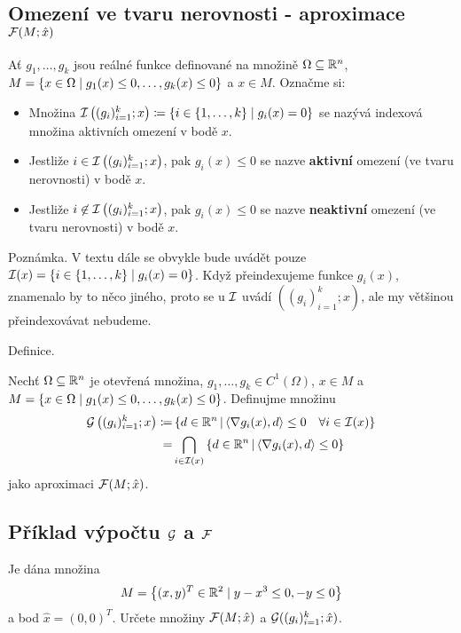 \subsection{Omezení ve tvaru nerovnosti - aproximace \texorpdfstring{$\mathcal{F}(M;\hat x)$}{F(M;x)}}
Ať $g_1, \dots, g_k$ jsou reálné funkce definované na množině $\Omega \subseteq \mathbb{R}^n$,
$M = \left\lbrace x \in \Omega \mid g_1(x) \leq 0, \dots, g_k(x) \leq 0 \right\rbrace$ a $x \in M$.
Označme si:
\begin{itemize}
    \item Množina $\mathcal{I} \left((g_i)_{i=1}^k;x\right)\coloneq \left\lbrace i \in \left\lbrace 1, \dots, k \right\rbrace \mid g_i(x) = 0 \right\rbrace$ se nazývá
    indexová množina aktivních omezení v bodě $x$.
    \item Jestliže $i \in \mathcal{I} \left((g_i)_{i=1}^k;x\right)$, pak $g_i(x) \leq 0$ se nazve \textbf{aktivní} omezení (ve
    tvaru nerovnosti) v bodě $x$.
    \item Jestliže $i \not\in \mathcal{I} \left((g_i)_{i=1}^k;x\right)$, pak $g_i(x) \leq 0$ se nazve \textbf{neaktivní} omezení
    (ve tvaru nerovnosti) v bodě $x$.
\end{itemize}
Poznámka. V textu dále se obvykle bude uvádět pouze $\mathcal{I}(x) = \left\lbrace i \in \left\lbrace 1, \dots, k \right\rbrace \mid g_i(x) = 0 \right\rbrace$. Když
přeindexujeme funkce $g_i(x)$, znamenalo by to něco jiného, proto se u $\mathcal{I}$ uvádí $\left((g_i)_{i=1}^k;x\right)$, ale my
většinou přeindexovávat nebudeme.

Definice.

Nechť $\Omega \subseteq \mathbb{R}^n$ je otevřená množina, $g_1, \dots, g_k \in C^1(\Omega)$, $x \in M$ a $M = \left\lbrace x \in \Omega
\mid g_1(x) \leq 0, \dots, g_k (x) \leq 0 \right\rbrace$. Definujme množinu
\begin{align*}
    \mathcal{G} \left( (g_i)_{i=1}^k; x\right) \coloneq& \left\lbrace d \in \mathbb{R}^n \, \middle| \, \langle \nabla g_i(x), d \rangle \leq 0 \quad \forall i \in \mathcal{I} (x) \right\rbrace \\
    =& \bigcap_{i \in \mathcal{I}(x)} \left\lbrace d \in \mathbb{R}^n \, \middle| \, \langle \nabla g_i (x), d\rangle \leq 0 \right\rbrace
\end{align*}
jako aproximaci $\mathcal{F}(M; \hat x)$.


\subsection{Příklad výpočtu \texorpdfstring{$\mathcal{G}$}{G} a \texorpdfstring{$\mathcal{F}$}{F}}
Je dána množina
\[
    M = \left\lbrace (x, y)^T \in \mathbb{R}^2 \mid y - x^3 \leq 0, -y \leq 0 \right\rbrace
\] a bod $\hat x = (0, 0)^T$. Určete množiny $\mathcal{F}(M; \hat x)$ a $\mathcal{G}((g_i)_{i=1}^k; \hat x)$.

